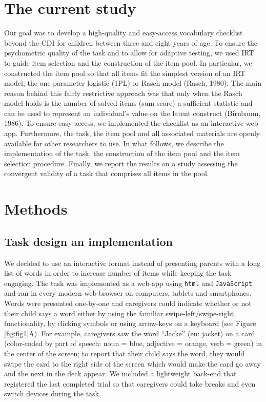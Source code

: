 \documentclass[
  man,floatsintext]{apa6}
\begin{document}
\hypertarget{the-current-study}{%
\section{The current study}\label{the-current-study}}

Our goal was to develop a high-quality and easy-access vocabulary checklist beyond the CDI for children between three and eight years of age. To ensure the psychometric quality of the task and to allow for adaptive testing, we used IRT to guide item selection and the construction of the item pool. In particular, we constructed the item pool so that all items fit the simplest version of an IRT model, the one-parameter logistic (1PL) or Rasch model (Rasch, 1980). The main reason behind this fairly restrictive approach was that only when the Rasch model holds is the number of solved items (sum score) a sufficient statistic and can be used to represent an individual's value on the latent construct (Birnbaum, 1986). To ensure easy-access, we implemented the checklist as an interactive web-app. Furthermore, the task, the item pool and all associated materials are openly available for other researchers to use. In what follows, we describe the implementation of the task, the construction of the item pool and the item selection procedure. Finally, we report the results on a study assessing the convergent validity of a task that comprises all items in the pool.

\hypertarget{methods}{%
\section{Methods}\label{methods}}

\hypertarget{task-design-an-implementation}{%
\subsection{Task design an implementation}\label{task-design-an-implementation}}

We decided to use an interactive format instead of presenting parents with a long list of words in order to increase number of items while keeping the task engaging. The task was implemented as a web-app using \texttt{html} and \texttt{JavaScript} and ran in every modern web-browser on computers, tablets and smartphones. Words were presented one-by-one and caregivers could indicate whether or not their child says a word either by using the familiar swipe-left/swipe-right functionality, by clicking symbols or using arrow-keys on a keyboard (see Figure \ref{fig:fig1}A). For example, caregivers saw the word ``Jacke'' (en: jacket) on a card (color-coded by part of speech: noun = blue, adjective = orange, verb = green) in the center of the screen; to report that their child says the word, they would swipe the card to the right side of the screen which would make the card go away and the next in the deck appear. We included a lightweight back-end that registered the last completed trial so that caregivers could take breaks and even switch devices during the task.
\end{document}
